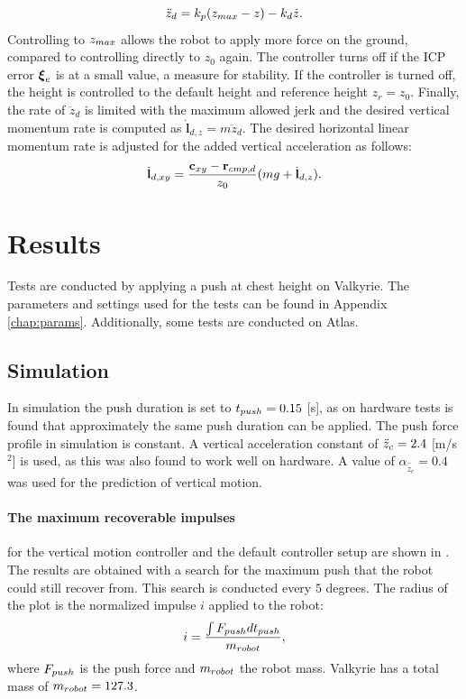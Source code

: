 \begin{equation}
	\ddot{z}_d = k_p(z_{max}-z)-k_d\dot{z}.
\end{equation}
Controlling to $z_{max}$ allows the robot to apply more force on the ground, compared to controlling directly to $z_0$ again. The controller turns off if the \ac{ICP} error $\boldsymbol{\xi}_e$ is at a small value, a measure for stability. If the controller is turned off, the height is controlled to the default height and reference height $z_r=z_0$. Finally, the rate of $\ddot{z}_d$ is limited with the maximum allowed jerk and the desired vertical momentum rate is computed as $\dot{\mathbf{l}}_{d,z}=m\ddot{z}_d$. The desired horizontal linear momentum rate is adjusted for the added vertical acceleration as follows:
\begin{equation}
    \dot{\mathbf{l}}_{d,xy}= \frac{\mathbf{c}_{xy}-\mathbf{r}_{cmp,d}}{z_0}(mg+\dot{\mathbf{l}}_{d,z}).
\end{equation}

\section{Results}
Tests are conducted by applying a push at chest height on Valkyrie. The parameters and settings used for the tests can be found in Appendix \ref{chap:params}. Additionally, some tests are conducted on Atlas.

\subsection{Simulation}
In simulation the push duration is set to $t_{push}=0.15$ [s], as on hardware tests is found that approximately the same push duration can be applied. The push force profile in simulation is constant. A vertical acceleration constant of $\ddot{z}_{c}=2.4$ [m/s$^2$] is used, as this was also found to work well on hardware. A value of $\alpha_{\hat{\ddot{z}}_{c}}=0.4$ was used for the prediction of vertical motion.

\paragraph{The maximum recoverable impulses} for the vertical motion controller and the default controller setup are shown in . The results are obtained with a search for the maximum push that the robot could still recover from. This search is conducted every $5$ degrees. The radius of the plot is the normalized impulse $i$ applied to the robot:
\begin{equation}
	i = \frac{\int F_{push} dt_{push}}{m_{robot}},
\end{equation}
where $F_{push}$ is the push force and $m_{robot}$ the robot mass. Valkyrie has a total mass of $m_{robot}=127.3$.

